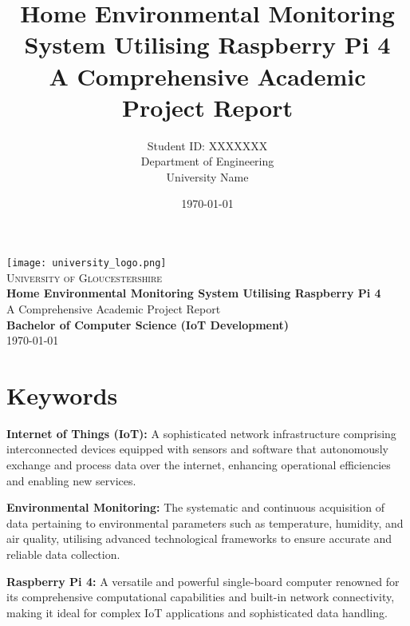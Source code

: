 \documentclass[a4paper, 12pt]{report}
\title{
\vspace{2cm}
\Huge{\textbf{Home Environmental Monitoring System Utilising Raspberry Pi 4}}\\[1cm]
\large{A Comprehensive Academic Project Report}\\[1cm]
}
\author{
\large{Student ID: XXXXXXX}\\[0.5cm]
\large{Department of Engineering}\\
\large{University Name}\\
}
\date{\today}
\begin{document}
\begin{titlepage}
    \begin{center}
        \vspace*{1cm}

        \texttt{[image: university\_logo.png]}\\[1cm] 
        \textsc{\Large University of Gloucestershire}\\[1.5cm]

        \textbf{\LARGE Home Environmental Monitoring System Utilising Raspberry Pi 4}\\[1cm]

        \large A Comprehensive Academic Project Report\\[1cm]
        
        \textbf{Bachelor of Computer Science (IoT Development)}\\[0.5cm]

        \vfill
        {\large \today}

    \end{center}
\end{titlepage}

\tableofcontents

\newpage

\section*{Keywords}

\textbf{Internet of Things (IoT):} A sophisticated network infrastructure comprising interconnected devices equipped with sensors and software that autonomously exchange and process data over the internet, enhancing operational efficiencies and enabling new services.

\vspace{0.5cm}

\textbf{Environmental Monitoring:} The systematic and continuous acquisition of data pertaining to environmental parameters such as temperature, humidity, and air quality, utilising advanced technological frameworks to ensure accurate and reliable data collection.

\vspace{0.5cm}

\textbf{Raspberry Pi 4:} A versatile and powerful single-board computer renowned for its comprehensive computational capabilities and built-in network connectivity, making it ideal for complex IoT applications and sophisticated data handling.
\end{document}
